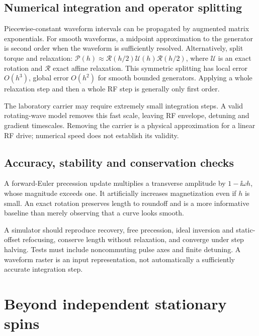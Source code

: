 \subsection{Numerical integration and operator splitting}
Piecewise-constant waveform intervals can be propagated by augmented
matrix exponentials. For smooth waveforms, a midpoint approximation to
the generator is second order when the waveform is sufficiently resolved.
Alternatively, split torque and relaxation:
$\mathcal P(h)\approx\mathcal R(h/2)\mathcal U(h)\mathcal R(h/2)$,
where $\mathcal U$ is an exact rotation and $\mathcal R$ exact affine
relaxation. This symmetric splitting has local error $O(h^3)$,
global error $O(h^2)$ for smooth bounded generators.
Applying a whole relaxation step and then a whole RF step is generally
only first order.

The laboratory carrier may require extremely small integration steps.
A valid rotating-wave model removes this fast scale, leaving RF envelope,
detuning and gradient timescales. Removing the carrier is a physical
approximation for a linear RF drive; numerical speed does not establish
its validity.

\subsection{Accuracy, stability and conservation checks}
A forward-Euler precession update multiplies a transverse amplitude by
$1-\ii\omega h$, whose magnitude exceeds one.
It artificially increases magnetization even if $h$ is small.
An exact rotation preserves length to roundoff and is a more informative
baseline than merely observing that a curve looks smooth.

A simulator should reproduce recovery, free precession, ideal inversion
and static-offset refocusing, conserve length without relaxation, and
converge under step halving. Tests must include noncommuting pulse axes
and finite detuning. A waveform raster is an input representation, not
automatically a sufficiently accurate integration step.

\section{Beyond independent stationary spins}
\label{sec:03:beyond-independent-stationary-spins}
